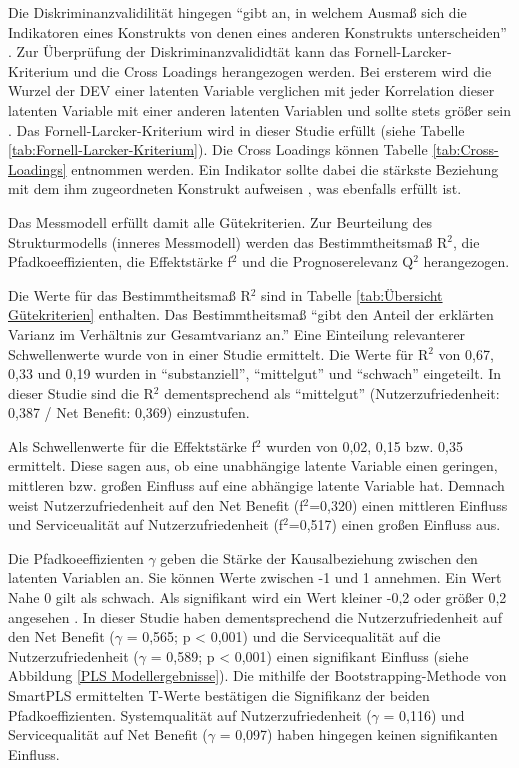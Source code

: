 Die Diskriminanzvalidilität hingegen "`gibt an, in welchem Ausmaß sich die Indikatoren eines Konstrukts von denen eines anderen Konstrukts unterscheiden"' \parencite[S.26]{nitzl2010anwenderorientierte}. Zur Überprüfung der Diskriminanzvalididtät kann das Fornell-Larcker-Kriterium und die Cross Loadings herangezogen werden. 
Bei ersterem wird die Wurzel der DEV einer latenten Variable verglichen mit jeder Korrelation dieser latenten Variable mit einer anderen latenten Variablen und sollte stets größer sein \parencite[vgl.][S.26]{nitzl2010anwenderorientierte}. Das Fornell-Larcker-Kriterium wird in dieser Studie erfüllt (siehe Tabelle \ref{tab:Fornell-Larcker-Kriterium}). Die Cross Loadings können Tabelle \ref{tab:Cross-Loadings} entnommen werden. Ein Indikator sollte dabei die stärkste Beziehung mit dem ihm zugeordneten Konstrukt aufweisen \parencite[vgl.][S.26]{nitzl2010anwenderorientierte}, was ebenfalls erfüllt ist.   \nocite{fornell1981evaluating}

Das Messmodell erfüllt damit alle Gütekriterien. Zur Beurteilung des Strukturmodells (inneres Messmodell) werden das Bestimmtheitsmaß R$^2$, die Pfadkoeeffizienten, die Effektstärke f$^2$ und die Prognoserelevanz Q$^2$ herangezogen.  

Die Werte für das Bestimmtheitsmaß R$^2$ sind in Tabelle \ref{tab:Übersicht Gütekriterien} enthalten. Das Bestimmtheitsmaß "`gibt den Anteil der erklärten Varianz im Verhältnis zur Gesamtvarianz an."' \parencite[S.32]{nitzl2010anwenderorientierte} Eine Einteilung relevanterer Schwellenwerte wurde von \textcite[S.323]{chin1998partial} in einer Studie ermittelt. Die Werte für R$^2$ von 0,67, 0,33 und 0,19 wurden in "`substanziell"', "`mittelgut"' und "`schwach"' eingeteilt. In dieser Studie sind die R$^2$ dementsprechend als "`mittelgut"' (Nutzerzufriedenheit: 0,387 / Net Benefit: 0,369) einzustufen.

Als Schwellenwerte für die Effektstärke f$^2$ wurden von \textcite[S.316f.]{chin1998partial} 0,02, 0,15 bzw. 0,35 ermittelt. Diese sagen aus, ob eine unabhängige latente Variable einen geringen, mittleren bzw. großen Einfluss auf eine abhängige latente Variable hat. Demnach weist Nutzerzufriedenheit auf den Net Benefit (f$^2$=0,320) einen mittleren Einfluss und Serviceualität auf Nutzerzufriedenheit (f$^2$=0,517) einen großen Einfluss aus. 

Die Pfadkoeeffizienten $\gamma$ geben die Stärke der Kausalbeziehung zwischen den latenten Variablen an. Sie können Werte zwischen -1 und 1 annehmen. Ein Wert Nahe 0 gilt als schwach. Als signifikant wird ein Wert kleiner -0,2 oder größer 0,2 angesehen \parencite[vgl.][S.11]{chin1998commentary}. In dieser Studie haben dementsprechend die Nutzerzufriedenheit auf den Net Benefit ($\gamma$ = 0,565; p < 0,001) und die Servicequalität auf die Nutzerzufriedenheit ($\gamma$ = 0,589; p < 0,001) einen signifikant Einfluss (siehe Abbildung \ref{PLS Modellergebnisse}). Die mithilfe der Bootstrapping-Methode von SmartPLS ermittelten T-Werte bestätigen die Signifikanz der beiden Pfadkoeffizienten. Systemqualität auf Nutzerzufriedenheit ($\gamma$ = 0,116) und Servicequalität auf Net Benefit ($\gamma$ = 0,097) haben hingegen keinen signifikanten Einfluss. 

